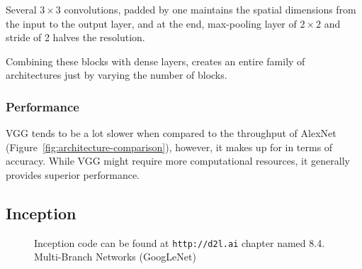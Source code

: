 \documentclass[11pt]{article}
\begin{document}
Several $3\times 3$ convolutions, padded by one maintains the spatial dimensions from the input to the output layer, and at the end, max-pooling layer of $ 2\times2$ and stride of 2 halves the resolution. 

Combining these blocks with dense layers, creates an entire family of architectures just by varying the number of blocks.

\subsubsection{Performance}

VGG tends to be a lot slower when compared to the throughput of AlexNet (Figure~\ref{fig:architecture-comparison}), however, it makes up for in terms of accuracy. While VGG might require more computational resources, it generally provides superior performance.

\subsection{Inception}

\begin{figure}
    \centering
    \caption{Inception code can be found at \texttt{http://d2l.ai} chapter named 8.4. Multi-Branch Networks (GoogLeNet)}
\end{figure}
\end{document}

